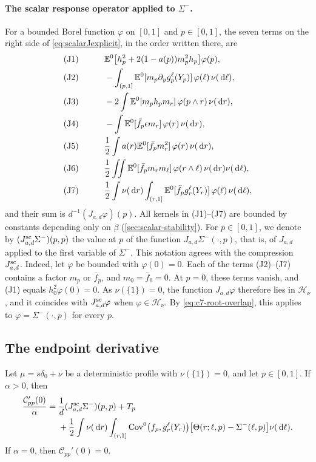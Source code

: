\paragraph{The scalar response operator applied to $\Sigma^-$.}
For a bounded Borel function $\varphi$ on $[0,1]$ and $p\in[0,1]$, the
seven terms on the right side of \eqref{eq:scalarJexplicit}, in the
order written there, are
\begin{alignat*}{2}
 &\text{(J1)}\qquad&&\mathbb E^0\bigl[h_p^2+2(1-a(p))m_p^2h_p\bigr]\varphi(p),\\
 &\text{(J2)}&&-\int_{(p,1]}\mathbb E^0[m_p\partial_y g_p^\ell(Y_p)]\,
                                      \varphi(\ell)\,\nu(\,\mathrm d\ell),\\
 &\text{(J3)}&&-2\int\mathbb E^0[m_ph_pm_r]\,\varphi(p\wedge r)\,\nu(\,\mathrm d r),\\
 &\text{(J4)}&&-\int\mathbb E^0[\bar f_p\epsilon m_r]\,\varphi(r)\,\nu(\,\mathrm d r),\\
 &\text{(J5)}&&\frac12\int a(r)\mathbb E^0[\bar f_pm_r^2]\,\varphi(r)\,\nu(\,\mathrm d r),\\
 &\text{(J6)}&&\frac12\iint\mathbb E^0[\bar f_pm_rm_\ell]\,\varphi(r\wedge\ell)
                                      \,\nu(\,\mathrm d r)\nu(\,\mathrm d\ell),\\
 &\text{(J7)}&&\frac12\int\nu(\,\mathrm d r)\int_{(r,1]}
           \mathbb E^0[\bar f_pg_r^\ell(Y_r)]\,\varphi(\ell)\,\nu(\,\mathrm d\ell),
\end{alignat*}
and their sum is $d^{-1}(J_{a,d}\varphi)(p)$. All kernels in (J1)--(J7)
are bounded by constants depending only on $\beta$
(\cref{sec:scalar-stability}). For $p\in[0,1]$, we denote by
$(J^{\mathrm{sc}}_{a,d}\Sigma^-)(p,p)$ the value at $p$ of the function
$J_{a,d}\Sigma^-(\cdot,p)$, that is, of $J_{a,d}$ applied to the first
variable of $\Sigma^-$. This notation agrees with the compression
$J^{\mathrm{sc}}_{a,d}$. Indeed, let $\varphi$ be bounded with
$\varphi(0)=0$. Each of the terms (J2)--(J7) contains a factor $m_p$
or $\bar f_p$, and $m_0=\bar f_0=0$. At $p=0$, these terms vanish, and
(J1) equals $h_0^2\varphi(0)=0$. As $\nu(\{1\})=0$, the function
$J_{a,d}\varphi$ therefore lies in $\mathcal H_\nu$,
and it coincides with $J^{\mathrm{sc}}_{a,d}\varphi$ when
$\varphi\in\mathcal H_\nu$. By \eqref{eq:c7-root-overlap}, this applies
to $\varphi=\Sigma^-(\cdot,p)$ for every $p$.

\subsection{The endpoint derivative}

\begin{lemma}
\label{lem:c7-endpoint-pointwise}
Let $\mu=s\delta_0+\nu$ be a deterministic profile with
$\nu(\{1\})=0$, and let $p\in[0,1]$. If $\alpha>0$, then
\begin{align}
 \frac{\mathcal C_{pp}'(0)}\alpha
 ={}&\frac1d(J^{\mathrm{sc}}_{a,d}\Sigma^-)(p,p)+T_p\nonumber\\
 &+\frac12\int\nu(\,\mathrm d r)\int_{(r,1]}
  \operatorname{Cov}^0\bigl(f_p,g_r^\ell(Y_r)\bigr)
    \bigl[\Theta(r;\ell,p)-\Sigma^-(\ell,p)\bigr]\nu(\,\mathrm d\ell).
 \label{eq:diagonallinear}
\end{align}
If $\alpha=0$, then $\mathcal C_{pp}'(0)=0$.
\end{lemma}

